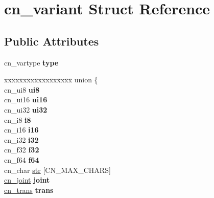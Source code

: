 \hypertarget{structcn__variant}{\section{cn\-\_\-variant Struct Reference}
\label{structcn__variant}
}
\subsection*{Public Attributes}
\begin{DoxyCompactItemize}
\item 
\hypertarget{structcn__variant_adfef3aead516fe20de0106eab01c9d22}{cn\-\_\-vartype {\bfseries type}}\label{structcn__variant_adfef3aead516fe20de0106eab01c9d22}

\item 
\hypertarget{structcn__variant_ab305c719d4588109523731890d77a861}{\begin{tabbing}
xx\=xx\=xx\=xx\=xx\=xx\=xx\=xx\=xx\=\kill
union \{\\
\hypertarget{unioncn__variant_1_1@0_a9fcdb37203f64f58d2a5fa538c463c4e}{\>cn\_ui8 {\bfseries ui8}\\
\hypertarget{unioncn__variant_1_1@0_a8f5409fb6a07a3469123cf6707a87c3f}{\>cn\_ui16 {\bfseries ui16}\\
\hypertarget{unioncn__variant_1_1@0_a6adbefb0f2bca56c51cc64d6123cba09}{\>cn\_ui32 {\bfseries ui32}\\
\hypertarget{unioncn__variant_1_1@0_a5f4e6248942a48c16b6a63d836bc419c}{\>cn\_i8 {\bfseries i8}\\
\hypertarget{unioncn__variant_1_1@0_ae6dd30e4e9c1c6d12818118ffe57e55e}{\>cn\_i16 {\bfseries i16}\\
\hypertarget{unioncn__variant_1_1@0_a2e2375469b4d321b1f5c35b67b093a77}{\>cn\_i32 {\bfseries i32}\\
\hypertarget{unioncn__variant_1_1@0_a0e47475e85ec0c887f549d3ad69b075c}{\>cn\_f32 {\bfseries f32}\\
\hypertarget{unioncn__variant_1_1@0_abc3afcbfd198c2c276b8a96eaf12828a}{\>cn\_f64 {\bfseries f64}\\
\>cn\_char \hyperlink{structcn__variant_a48025757ba45da64d04bfcfbf6343ebb}{str} \mbox{[}CN\_MAX\_CHARS\mbox{]}\\
\hypertarget{unioncn__variant_1_1@0_afddbd51a7ab5b14ab2dcb2f6ebd76905}{\>\hyperlink{structcn__joint}{cn\_joint} {\bfseries joint}\\
\hypertarget{unioncn__variant_1_1@0_a019f911eb0c773a69ba8224dee7417dd}{\>\hyperlink{structcn__trans}{cn\_trans} {\bfseries trans}\\
}}}}}}}}}}
\end{tabbing}}
\end{DoxyCompactItemize}

